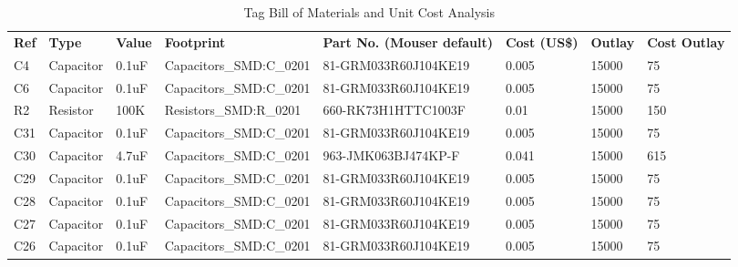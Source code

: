 \begin{landscape}
\begin{table}[]
\centering
\tiny
\caption{Tag Bill of Materials and Unit Cost Analysis}
\label{bom}
\begin{tabular}{llllllll}
\textbf{Ref}   & \textbf{Type} & \textbf{Value}             & \textbf{Footprint}              & \textbf{Part No. (Mouser default)}   & \textbf{Cost (US\$)} & \textbf{Outlay} & \textbf{Cost Outlay} \\
C4             & Capacitor     & 0.1uF                      & Capacitors\_SMD:C\_0201         & 81-GRM033R60J104KE19                 & 0.005                & 15000           & 75                   \\
C6             & Capacitor     & 0.1uF                      & Capacitors\_SMD:C\_0201         & 81-GRM033R60J104KE19                 & 0.005                & 15000           & 75                   \\
R2             & Resistor      & 100K                       & Resistors\_SMD:R\_0201          & 660-RK73H1HTTC1003F                  & 0.01                 & 15000           & 150                  \\
C31            & Capacitor     & 0.1uF                      & Capacitors\_SMD:C\_0201         & 81-GRM033R60J104KE19                 & 0.005                & 15000           & 75                   \\
C30            & Capacitor     & 4.7uF                      & Capacitors\_SMD:C\_0201         & 963-JMK063BJ474KP-F                  & 0.041                & 15000           & 615                  \\
C29            & Capacitor     & 0.1uF                      & Capacitors\_SMD:C\_0201         & 81-GRM033R60J104KE19                 & 0.005                & 15000           & 75                   \\
C28            & Capacitor     & 0.1uF                      & Capacitors\_SMD:C\_0201         & 81-GRM033R60J104KE19                 & 0.005                & 15000           & 75                   \\
C27            & Capacitor     & 0.1uF                      & Capacitors\_SMD:C\_0201         & 81-GRM033R60J104KE19                 & 0.005                & 15000           & 75                   \\
C26            & Capacitor     & 0.1uF                      & Capacitors\_SMD:C\_0201         & 81-GRM033R60J104KE19                 & 0.005                & 15000           & 75                   \\

\end{tabular}
\end{table}
\end{landscape}
